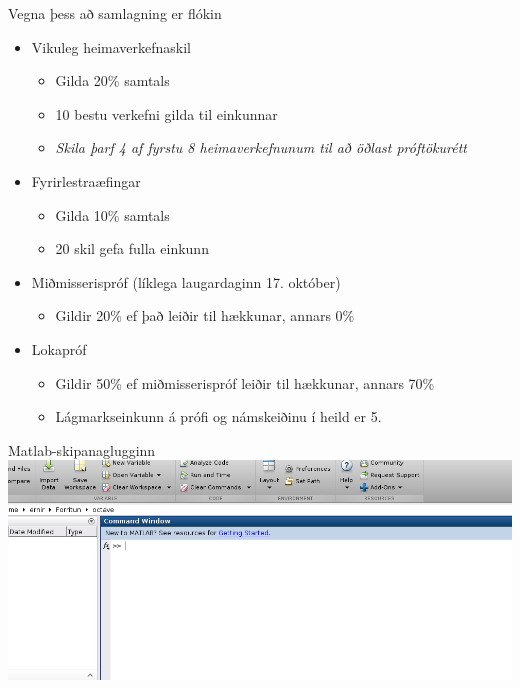 \documentclass[handout]{beamer}
\begin{document}
\begin{frame}{Vegna þess að samlagning er flókin}
\begin{itemize}
 \item Vikuleg heimaverkefnaskil
 \begin{itemize}
  \item Gilda 20\% samtals
  \item 10 bestu verkefni gilda til einkunnar
  \item \emph{Skila þarf 4 af fyrstu 8 heimaverkefnunum til að öðlast próftökurétt}
 \end{itemize}
 \item Fyrirlestraæfingar
 \begin{itemize}
  \item Gilda 10\% samtals
  \item 20 skil gefa fulla einkunn
 \end{itemize}
 \item Miðmisserispróf (líklega laugardaginn 17. október)
 \begin{itemize}
  \item Gildir {\color{red} 20\%} ef það leiðir til hækkunar, annars 0\%
 \end{itemize}
 \item Lokapróf
 \begin{itemize}
  \item Gildir 50\% ef miðmisserispróf leiðir til hækkunar, annars {\color{red} 70\%}
  \item Lágmarkseinkunn á prófi og námskeiðinu í heild er 5.
 \end{itemize}
\end{itemize}
\end{frame}


\begin{frame}{Matlab-skipanaglugginn}
\includegraphics[width=\textwidth]{Pics/command-window}
\end{frame}
\end{document}
